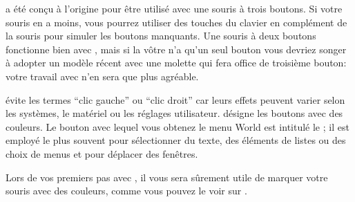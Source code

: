 \documentclass[a4paper,10pt,twoside]{book}
\begin{document}
\sq a été conçu à l'origine pour être utilisé avec une souris à trois
boutons. Si votre souris en a moins, vous pourrez utiliser des touches
du clavier en complément de la souris pour simuler les boutons
manquants. Une souris à deux boutons fonctionne bien avec \sq, mais si
la v\^otre n'a qu'un seul bouton vous devriez songer à adopter un
modèle récent avec une molette qui fera office de troisième bouton: votre travail avec \sq n'en sera que plus agréable.


\sq évite les termes ``clic gauche'' ou ``clic droit'' car leurs
effets peuvent varier selon les systèmes, le mat\'eriel ou les
réglages utilisateur. \sq désigne les boutons avec des couleurs. Le
bouton avec lequel vous obtenez le menu World est intitulé le
; il est employé le plus souvent pour
s\'electionner du texte, des \'el\'ements de listes ou des choix de
menus et pour déplacer des fenêtres.

 
Lors de vos premiers pas avec \sq, il vous sera sûrement utile de
marquer votre souris avec des couleurs, comme vous pouvez le voir sur .
\end{document}
